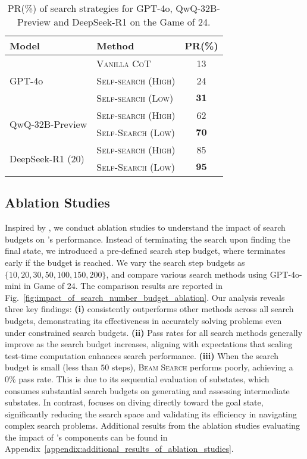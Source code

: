 \begin{table}[t]
\caption{PR(\%) of search strategies for GPT-4o, QwQ-32B-Preview and DeepSeek-R1 on the Game of 24.}
\centering
\small
\tabcolsep 3.5pt
\renewcommand\arraystretch{1.0}
\begin{tabular}{llc}
\toprule
\multirow{1}{*}{Model} &
\multirow{1}{*}{Method} &
PR(\%) \\
\midrule
\multirow{3}{*}{GPT-4o} &
\textsc{Vanilla CoT} & \num{13} \\
& \textsc{Self-search (High)}  & \num{24} \\
& \textsc{Self-search (Low)}  & $\mathbf{31}$ \\
\midrule
\multirow{2}{*}{QwQ-32B-Preview} &
\textsc{Self-search (High)}  & \num{62} \\
& \textsc{Self-Search (Low)}  & $\mathbf{70}$ \\
\midrule
\multirow{2}{*}{DeepSeek-R1 (20)} &
\textsc{Self-search (High)}  & \num{85} \\
& \textsc{Self-Search (Low)}  & $\mathbf{95}$ \\
\bottomrule
\end{tabular}
\label{tab:self_search_result}
\end{table}

\subsection{Ablation Studies}
Inspired by \citet{snell2024scaling}, we conduct ablation studies to understand the impact of search budgets on \method's performance. Instead of terminating the search upon finding the final state, we introduced a pre-defined search step budget, where \method terminates early if the budget is reached. We vary the search step budgets as $\{10, 20, 30, 50, 100, 150, 200\}$, and compare various search methods using GPT-4o-mini in Game of 24. The comparison results are reported in Fig.~\ref{fig:impact_of_search_number_budget_ablation}. Our analysis reveals three key findings: \textbf{(i)} \method consistently outperforms other methods across all search budgets, demonstrating its effectiveness in accurately solving problems even under constrained search budgets. \textbf{(ii)} Pass rates for all search methods generally improve as the search budget increases, aligning with expectations that scaling test-time computation enhances search performance. 
\textbf{(iii)} When the search budget is small (less than $50$ steps), \textsc{Beam Search} performs poorly, achieving a 
$0\%$ pass rate. This is due to its sequential evaluation of substates, which consumes substantial search budgets on generating and assessing intermediate substates. In contrast, \method focuses on diving directly toward the goal state, significantly reducing the search space and validating its efficiency in navigating complex search problems. Additional results from the ablation studies evaluating the impact of \method's components can be found in Appendix~\ref{appendix:additional_results_of_ablation_studies}.


